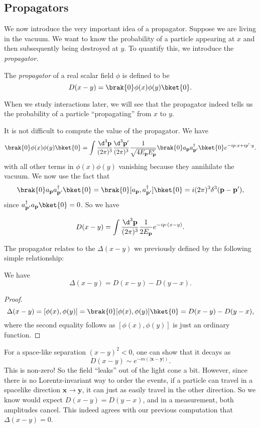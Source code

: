 \documentclass[a4paper]{article}
\begin{document}
\subsection{Propagators}
We now introduce the very important idea of a propagator. Suppose we are living in the vacuum. We want to know the probability of a particle appearing at $x$ and then subsequently being destroyed at $y$. To quantify this, we introduce the \emph{propagator}.
\begin{defi}[Propagator]
  The \emph{propagator} of a real scalar field $\phi$ is defined to be
  \[
    D(x - y) = \brak{0}\phi(x) \phi(y) \bket{0}.
  \]
\end{defi}
When we study interactions later, we will see that the propagator indeed tells us the probability of a particle ``propagating'' from $x$ to $y$.

It is not difficult to compute the value of the propagator. We have
\[
  \brak{0}\phi(x) \phi(y) \bket{0} = \int \frac{\d^3 \mathbf{p}}{(2\pi)^3} \frac{\d^3 \mathbf{p}'}{(2\pi)^3} \frac{1}{\sqrt{4E_\mathbf{p} E_\mathbf{p}'}} \brak{0}a_\mathbf{p} a_{\mathbf{p}'}^\dagger \bket{0} e^{-i p \cdot x + i p' \cdot y}.
\]
with all other terms in $\phi(x) \phi(y)$ vanishing because they annihilate the vacuum. We now use the fact that
\[
  \brak{0}a_\mathbf{p} a_\mathbf{p'}^\dagger\bket{0} = \brak{0}[a_\mathbf{p}, a_\mathbf{p'}^\dagger]\bket{0} = i (2\pi)^3 \delta^3 (\mathbf{p} - \mathbf{p}'),
\]
since $a_\mathbf{p'}^\dagger a_\mathbf{p} \bket{0} = 0$. So we have
\begin{prop}
  \[
    D(x - y) = \int \frac{\d^3 \mathbf{p}}{(2\pi)^3} \frac{1}{2 E_\mathbf{p}} e^{-i p \cdot (x - y)}.
  \]
\end{prop}

The propagator relates to the $\Delta(x - y)$ we previously defined by the following simple relationship:
\begin{prop}
  We have
  \[
    \Delta(x - y) = D(x - y) - D(y - x).
  \]
\end{prop}

\begin{proof}
  \[
    \Delta(x - y) = [\phi(x), \phi(y)] = \brak{0}[\phi(x), \phi(y)]\bket{0} = D(x - y) - D(y - x),
  \]
  where the second equality follows as $[\phi(x), \phi(y)]$ is just an ordinary function.
\end{proof}

For a space-like separation $(x - y)^2 < 0$, one can show that it decays as
\[
  D(x - y) \sim e^{-m(|\mathbf{x} - \mathbf{y}|)}.
\]
This is non-zero! So the field ``leaks'' out of the light cone a bit. However, since there is no Lorentz-invariant way to order the events, if a particle can travel in a spacelike direction $\mathbf{x} \to \mathbf{y}$, it can just as easily travel in the other direction. So we know would expect $D(x - y) = D(y - x)$, and in a measurement, both amplitudes cancel. This indeed agrees with our previous computation that $\Delta(x - y) = 0$.
\end{document}
